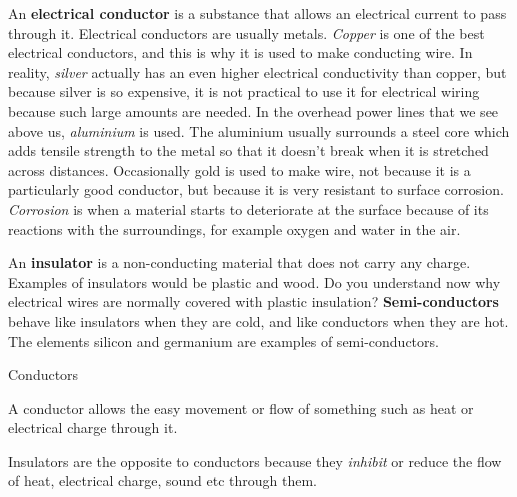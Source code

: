             \label{m38706*id66058}An \textbf{electrical conductor} is a substance that allows an electrical current to pass through it. Electrical conductors are usually metals. \textsl{Copper} is one of the best electrical conductors, and this is why it is used to make conducting wire. In reality, \textsl{silver} actually has an even higher electrical conductivity than copper, but because silver is so expensive, it is not practical to use it for electrical wiring because such large amounts are needed. In the overhead power lines that we see above us, \textsl{aluminium} is used. The aluminium usually surrounds a steel core which adds tensile strength to the metal so that it doesn't break when it is stretched across distances. Occasionally gold is used to make wire, not because it is a particularly good conductor, but because it is very resistant to surface corrosion. \textsl{Corrosion} is when a material starts to deteriorate at the surface because of its reactions with the surroundings, for example oxygen and water in the air.\par 
      \label{m38706*id66098}An \textbf{insulator} is a non-conducting material that does not carry any charge. Examples of insulators would be plastic and wood. Do you understand now why electrical wires are normally covered with plastic insulation? \textbf{Semi-conductors} behave like insulators when they are cold, and like conductors when they are hot. The elements silicon and germanium are examples of semi-conductors.\par 
\Definition
{Conductors} 
{A conductor allows the easy movement or flow of something such as heat or electrical charge through it.  \par 
       } 
{Insulators are the opposite to conductors because they \textsl{inhibit} or reduce the flow of heat, electrical charge, sound etc through them. \par}

